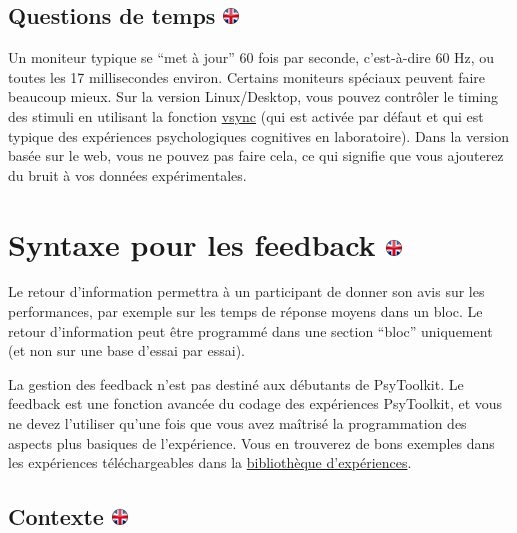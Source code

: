 \documentclass[
]{book}
\begin{document}
\hypertarget{questions-de-temps}{%
\subsection[Questions de temps ]{\texorpdfstring{Questions de temps
\href{https://www.psytoolkit.org/doc3.1.0/stimuli.html\#_timing_issues}{\protect\includegraphics{img/ukflag.png}}}{Questions de temps }}\label{questions-de-temps}}

Un moniteur typique se ``met à jour'' 60 fois par seconde, c'est-à-dire
60 Hz, ou toutes les 17 millisecondes environ. Certains moniteurs
spéciaux peuvent faire beaucoup mieux. Sur la version Linux/Desktop,
vous pouvez contrôler le timing des stimuli en utilisant la fonction
\protect\hyperlink{vsync}{vsync} (qui est activée par défaut et qui est
typique des expériences psychologiques cognitives en laboratoire). Dans
la version basée sur le web, vous ne pouvez pas faire cela, ce qui
signifie que vous ajouterez du bruit à vos données expérimentales.

\hypertarget{syntaxe-pour-les-feedback}{%
\section[Syntaxe pour les feedback ]{\texorpdfstring{Syntaxe pour les
feedback
\href{https://www.psytoolkit.org/doc3.1.0/feedback.html}{\protect\includegraphics{img/ukflag.png}}}{Syntaxe pour les feedback }}\label{syntaxe-pour-les-feedback}}

Le retour d'information permettra à un participant de donner son avis
sur les performances, par exemple sur les temps de réponse moyens dans
un bloc. Le retour d'information peut être programmé dans une section
``bloc'' uniquement (et non sur une base d'essai par essai).

La gestion des feedback n'est pas destiné aux débutants de PsyToolkit.
Le feedback est une fonction avancée du codage des expériences
PsyToolkit, et vous ne devez l'utiliser qu'une fois que vous avez
maîtrisé la programmation des aspects plus basiques de l'expérience.
Vous en trouverez de bons exemples dans les expériences téléchargeables
dans la
\href{http://www.psytoolkit.org/experiment-library/}{bibliothèque
d'expériences}.

\hypertarget{contexte}{%
\subsection[Contexte ]{\texorpdfstring{Contexte
\href{https://www.psytoolkit.org/doc3.1.0/feedback.html\#_background}{\protect\includegraphics{img/ukflag.png}}}{Contexte }}\label{contexte}}
\end{document}
